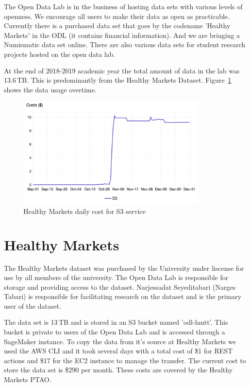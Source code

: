 The Open Data Lab is in the business of hosting data sets with various levels of openness. We encourage all users to make their data as open as practicable. Currently there is a purchased data set that goes by the codename 'Healthy Markets' in the ODL (it contains financial information). And we are bringing a Numismatic data set online. There are also various data sets for student research  projects hosted on the open data lab.

At the end of 2018-2019 academic year the total amount of data in the lab was  13.6\,TB. This is predominantly from the Healthy Markets Dataset. Figure~\ref{fig:s3cost} shows the data usage overtime.

\begin{figure}[!hbtp]
\includegraphics[width=0.85\textwidth]{images/odl-s3-usage-2018.png}
\caption{Healthy Markets daily cost for S3 service}
\label{fig:s3cost}
\end{figure}



\section{Healthy Markets}
The Healthy Markets dataset was purchased by the University under liscense for use by  all members of the university. The Open Data Lab is responsible for storage and providing access to the dataset. Narjessadat Seyeditabari (Narges Tabari) is responsible for facilitating research on the dataset and is the primary user of the dataset.

The data set is 13\,TB and is stored in an S3 bucket named 'odl-hmtt'. This bucket is private to users of the Open Data Lab and is accessed through a SageMaker instance. To copy the data from it's source at Healthy Markets we used the AWS CLI and it took several days with a total cost of \$1 for REST actions and \$17 for the EC2 instance to manage the transfer. The current cost to store the data set is \$290 per month. These costs are covered by the Healthy Markets PTAO.

